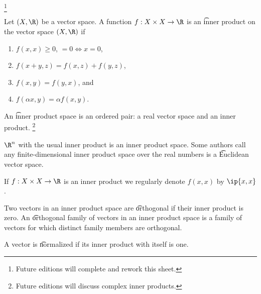 
  \ifhmode\unskip\fi\footnote{
Future editions will complete and rework this sheet.
  }


Let $(X, \R)$ be a vector space.
A function $f: X \times X \to \R$ is an \t{inner product} on the vector space $(X, \R)$ if
  \begin{enumerate}
  \item $f(x,x) \geq 0$, $= 0 \iff x = 0$,
  \item $f(x+y,z) = f(x,z) + f(y, z)$,
  \item $f(x,y) = f(y,x)$, and
  \item $f(\alpha x,y) = \alpha f(x,y)$.
  \end{enumerate}
An \t{inner product space} is an ordered pair: a real vector space and an inner product.
  \ifhmode\unskip\fi\footnote{
Future editions will discuss complex inner products.
  }


$\R^n$ with the usual inner product is an inner product space.
Some authors call any finite-dimensional inner product space over the real numbers is a \t{Euclidean vector space}.


If $f: X \times X \to \R$ is an inner product we regularly denote $f(x, x)$ by $\ip{x,x}$.


Two vectors in an inner product space are \t{orthogonal} if their inner product is zero.
An \t{orthogonal family of vectors} in an inner product space is a family of vectors for which distinct family members are orthogonal.

A vector is \t{normalized} if its inner product with itself is one.

\blankpage
